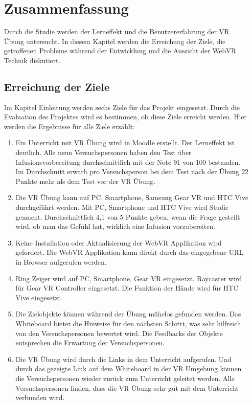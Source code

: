 \chapter{Zusammenfassung}

Durch die Studie werden der Lerneffekt und die Benutzererfahrung der VR Übung untersucht. In diesem Kapitel werden die Erreichung der Ziele, die getroffenen Probleme während der Entwicklung und die Aussicht der WebVR Technik diskutiert.

\section{Erreichung der Ziele}

Im Kapitel Einleitung werden sechs Ziele für das Projekt eingesetzt. Durch die Evaluation des Projektes wird es bestimmen, ob diese Ziele erreicht werden. Hier werden die Ergebnisse für alle Ziele erzählt:

\begin{enumerate}[labelsep=1ex]
	\renewcommand{\labelenumi}{\textbf{Z\theenumi.}}
	\item Ein Unterricht mit VR Übung wird in Moodle erstellt. Der Lerneffekt ist deutlich. Alle neun Versuchspersonen haben den Test über Infusionsvorbereitung durchschnittlich mit der Note 91 von 100 bestanden. Im Durchschnitt erwarb pro Versuchsperson bei dem Test nach der Übung 22 Punkte mehr als dem Test vor der VR Übung.
	
	\item Die VR Übung kann auf PC, Smartphone, Samsung Gear VR und HTC Vive durchgeführt werden. Mit PC, Smartphone und HTC Vive wird Studie gemacht. Durchschnittlich 4,1 von 5 Punkte geben, wenn die Frage gestellt wird, ob man das Gefühl hat, wirklich eine Infusion vorzubereiten.
	
	\item Keine Installation oder Aktualisierung der WebVR Applikation wird gefordert. Die WebVR Applikation kann direkt durch das eingegebene URL in Browser aufgerufen werden.
	
	\item Ring Zeiger wird auf PC, Smartphone, Gear VR eingesetzt. Raycaster wird für Gear VR Controller eingesetzt. Die Funktion der Hände wird für HTC Vive eingesetzt.
	
	\item Die Zielobjekte können während der Übung mühelos gefunden werden. Das Whiteboard bietet die Hinweise für den nächsten Schritt, was sehr hilfreich von den Versuchspersonen bewertet wird. Die Feedbacks der Objekte entsprechen die Erwartung der Versuchspersonen.
	
	\item Die VR Übung wird durch die Links in dem Unterricht aufgerufen. Und durch das gezeigte Link auf dem Whiteboard in der VR Umgebung können die Versuchspersonen wieder zurück zum Unterricht geleitet werden. Alle Versuchspersonen finden, dass die VR Übung sehr gut mit dem Unterricht verbunden wird.
	
\end{enumerate}

